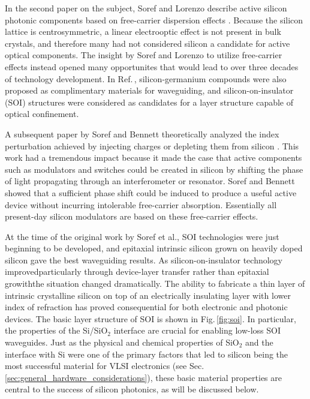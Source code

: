 In the second paper on the subject, Soref and Lorenzo describe active silicon photonic components based on free-carrier dispersion effects \cite{solo1986}. Because the silicon lattice is centrosymmetric, a linear electrooptic effect is not present in bulk crystals, and therefore many had not considered silicon a candidate for active optical components. The insight by Soref and Lorenzo to utilize free-carrier effects instead opened many opportunites that would lead to over three decades of technology development. In Ref.\,, silicon-germanium compounds were also proposed as complimentary materials for waveguiding, and silicon-on-insulator (SOI) structures were considered as candidates for a layer structure capable of optical confinement.

A subsequent paper by Soref and Bennett theoretically analyzed the index perturbation achieved by injecting charges or depleting them from silicon \cite{sobe1987}. This work had a tremendous impact because it made the case that active components such as modulators and switches could be created in silicon by shifting the phase of light propagating through an interferometer or resonator. Soref and Bennett showed that a sufficient phase shift could be induced to produce a useful active device without incurring intolerable free-carrier absorption. Essentially all present-day silicon modulators are based on these free-carrier effects.

At the time of the original work by Soref et al., SOI technologies were just beginning to be developed, and epitaxial intrinsic silicon grown on heavily doped silicon gave the best waveguiding results. As silicon-on-insulator technology improved\textemdash particularly through device-layer transfer rather than epitaxial growith\textemdash the situation changed dramatically. The ability to fabricate a thin layer of intrinsic crystalline silicon on top of an electrically insulating layer with lower index of refraction has proved consequential for both electronic and photonic devices. The basic layer structure of SOI is shown in Fig.\,\ref{fig:soi}. In particular, the properties of the Si/SiO$_2$ interface are crucial for enabling low-loss SOI waveguides. Just as the physical and chemical properties of SiO$_2$ and the interface with Si were one of the primary factors that led to silicon being the most successful material for VLSI electronics (see Sec.\,\ref{sec:general_hardware_considerations}), these basic material properties are central to the success of silicon photonics, as will be discussed below.

